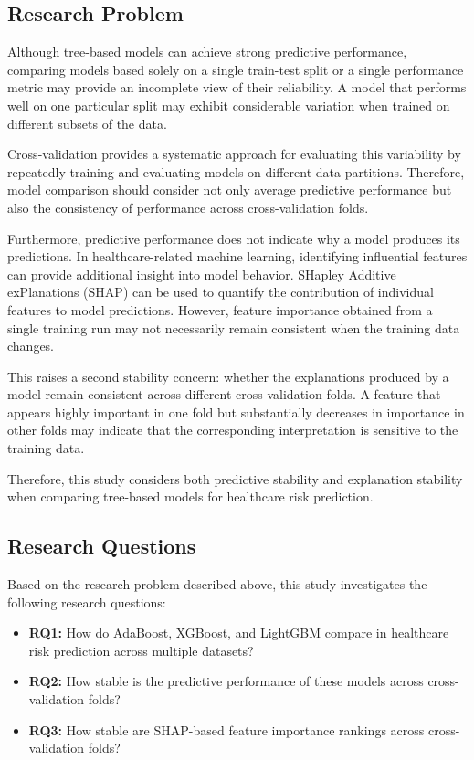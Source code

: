 \documentclass[12pt]{ai_conquer2026}
\begin{document}
\subsection{Research Problem}

Although tree-based models can achieve strong predictive performance,
comparing models based solely on a single train-test split or a single performance
metric may provide an incomplete view of their reliability. A model that performs
well on one particular split may exhibit considerable variation when trained on
different subsets of the data.

Cross-validation provides a systematic approach for evaluating this variability by
repeatedly training and evaluating models on different data partitions. Therefore,
model comparison should consider not only average predictive performance but
also the consistency of performance across cross-validation folds.

Furthermore, predictive performance does not indicate why a model produces its
predictions. In healthcare-related machine learning, identifying influential
features can provide additional insight into model behavior. SHapley Additive
exPlanations (SHAP) can be used to quantify the contribution of individual
features to model predictions. However, feature importance obtained from a
single training run may not necessarily remain consistent when the training data
changes.

This raises a second stability concern: whether the explanations produced by a
model remain consistent across different cross-validation folds. A feature that
appears highly important in one fold but substantially decreases in importance
in other folds may indicate that the corresponding interpretation is sensitive to
the training data.

Therefore, this study considers both predictive stability and explanation
stability when comparing tree-based models for healthcare risk prediction.


\subsection{Research Questions}

Based on the research problem described above, this study investigates the
following research questions:

\begin{itemize}
    \item \textbf{RQ1:} How do AdaBoost, XGBoost, and LightGBM compare in
    healthcare risk prediction across multiple datasets?

    \item \textbf{RQ2:} How stable is the predictive performance of these models
    across cross-validation folds?

    \item \textbf{RQ3:} How stable are SHAP-based feature importance rankings
    across cross-validation folds?
\end{itemize}
\end{document}
